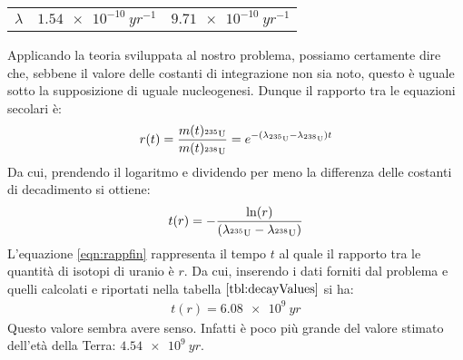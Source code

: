 \documentclass[../main]{subfiles}
\begin{document}
\begin{svol}
\begin{table}[h]
\begin{tabular}{c|cc}
			$\lambda$ & $\SI{1.54e-10}{yr^{-1}}$ & $\SI{9.71e-10}{yr^{-1}}$ \\ 
		\end{tabular} 
		\end{table}
		Applicando la teoria sviluppata al nostro problema, possiamo certamente dire che, sebbene il valore delle costanti di integrazione non sia noto, questo è uguale sotto la supposizione di uguale nucleogenesi. Dunque il rapporto tra le equazioni secolari è:
		\begin{gather}
		r(t)=\dfrac{m(t)_{^{235}\mathrm{U}}}{m(t)_{^{238}\mathrm{U}}}=e^{-(\lambda_{^{235}\mathrm{U}}-\lambda_{^{238}\mathrm{U}})t} \\
		\end{gather}
		Da cui, prendendo il logaritmo e dividendo per meno la differenza delle costanti di decadimento si ottiene:
		\begin{gather}
		\label{eqn:rappfin}
		t(r)=-\dfrac{\ln(r)}{(\lambda_{^{235}\mathrm{U}}-\lambda_{^{238}\mathrm{U}})}
		\end{gather}
		L'equazione \ref{eqn:rappfin} rappresenta il tempo $ t $ al quale il rapporto tra le quantità di isotopi di uranio è $ r $. Da cui, inserendo i dati forniti dal problema e quelli calcolati e riportati nella tabella $ \ref{tbl:decayValues} $ si ha:
		\begin{gather}
			t(r)=\SI{6.08e9}{yr}
		\end{gather}
		Questo valore sembra avere senso. Infatti è poco più grande del valore stimato dell'età della Terra: $ \SI{4.54e9}{yr} $.
	\end{svol}
\end{document}
